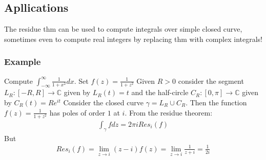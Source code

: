 \subsection{Apllications}
The residue thm can be used to compute integrals over simple closed curve, sometimes even to compute real integers by replacing thm with complex integrals!
\subsubsection{Example}
Compute $\int_{-\infty}^\infty \frac{1}{1+x^2}dx$. Set $f(z) = \frac{1}{1+z^2}$
Given $R>0$ consider the segment $L_R:[-R,R] \rightarrow \mathbb{C}$ given by $L_R(t) = t$ and the half-circle $C_R:[0,\pi ] \rightarrow \mathbb{C}$ given by $C_R(t) = Re^{it}$
Consider the closed curve $\gamma = L_R \cup C_R$. Then the function $f(z) = \frac{1}{1+z^2}$ has poles of order $1$ at $i$. From the residue theorem:
\begin{align*}
    \int_\gamma fdz = 2 \pi i Res_i(f)
\end{align*}
But 
\begin{align*}
    Res_i(f) = \lim_{z \rightarrow i} (z-i)f(z) = \lim_{z \rightarrow i}\frac{1}{z+i} = \frac{1}{2i}
\end{align*}
